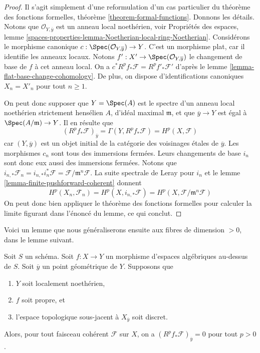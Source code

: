 \begin{proof}
Il s'agit simplement d'une reformulation d'un cas particulier du théorème
des fonctions formelles, théorème \ref{theorem-formal-functions}.
Donnons les détails. Notons que $\mathcal{O}_{Y, \overline{y}}$
est un anneau local noethérien, voir
Propriétés des espaces, lemme
\ref{spaces-properties-lemma-Noetherian-local-ring-Noetherian}.
Considérons le morphisme canonique
$c : \Spec(\mathcal{O}_{Y, \overline{y}}) \to Y$.
C'est un morphisme plat, car il identifie les anneaux locaux.
Notons $f' : X' \to \Spec(\mathcal{O}_{Y, \overline{y}})$
le changement de base de $f$ à cet anneau local. On a
$c^*R^pf_*\mathcal{F} = R^pf'_*\mathcal{F}'$ d'après le
lemme \ref{lemma-flat-base-change-cohomology}.
De plus, on dispose d'identifications canoniques $X_n = X'_n$
pour tout $n \geq 1$.

\medskip\noindent
On peut donc supposer que $Y = \Spec(A)$ est le spectre d'un
anneau local noethérien strictement hensélien $A$, d'idéal maximal
$\mathfrak m$, et que $\overline{y} \to Y$ est égal à
$\Spec(A/\mathfrak m) \to Y$. Il en résulte que
$$
\left(R^pf_*\mathcal{F}\right)_{\overline{y}} =
\Gamma(Y, R^pf_*\mathcal{F}) =
H^p(X, \mathcal{F})
$$
car $(Y, \overline{y})$ est un objet initial de la catégorie
des voisinages \'etales de $\overline{y}$.
Les morphismes $c_n$ sont tous des immersions fermées.
Leurs changements de base $i_n$ sont donc eux aussi des immersions fermées.
Notons que $i_{n, *}\mathcal{F}_n = i_{n, *}i_n^*\mathcal{F}
= \mathcal{F}/\mathfrak m^n\mathcal{F}$. La suite spectrale de Leray
pour $i_n$ et le lemme \ref{lemma-finite-pushforward-coherent} donnent
$$
H^p(X_n, \mathcal{F}_n) =
H^p(X, i_{n, *}\mathcal{F}) =
H^p(X, \mathcal{F}/\mathfrak m^n\mathcal{F})
$$
On peut donc bien appliquer le théorème des fonctions formelles pour calculer
la limite figurant dans l'énoncé du lemme, ce qui conclut.
\end{proof}

\noindent
Voici un lemme que nous généraliserons ensuite aux fibres de
dimension $ > 0$, dans le lemme suivant.

\begin{lemma}
\label{lemma-higher-direct-images-zero-finite-fibre}
Soit $S$ un schéma. Soit $f : X \to Y$ un morphisme d'espaces algébriques
au-dessus de $S$. Soit $\overline{y}$ un point géométrique de $Y$.
Supposons que
\begin{enumerate}
\item $Y$ soit localement noethérien,
\item $f$ soit propre, et
\item l'espace topologique sous-jacent à $X_{\overline{y}}$ soit discret.
\end{enumerate}
Alors, pour tout faisceau cohérent $\mathcal{F}$ sur $X$, on a
$(R^pf_*\mathcal{F})_{\overline{y}} = 0$ pour tout $p > 0$.
\end{lemma}

